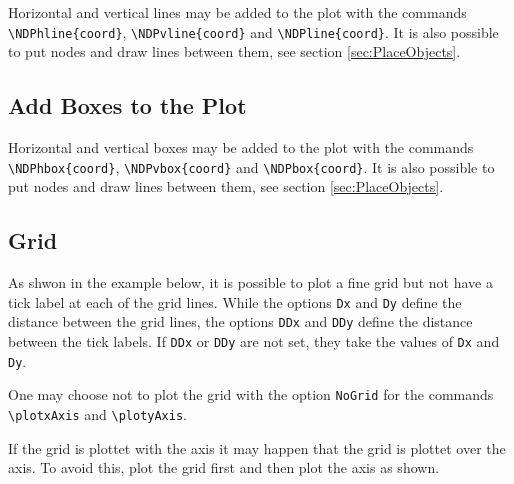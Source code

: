 Horizontal and vertical lines may be added to the plot with the commands
\verb|\NDPhline{coord}|, \verb|\NDPvline{coord}| and \verb|\NDPline{coord}|. It is also possible to put
nodes and draw lines between them, see section \ref{sec:PlaceObjects}.

\begin{minipage}[T]{0.5\linewidth}
	
\end{minipage}
\hspace{1ex}
\begin{minipage}[T]{0.4\linewidth}
	
\end{minipage}


\subsection{Add Boxes to the Plot}

Horizontal and vertical boxes may be added to the plot with the commands
\verb|\NDPhbox{coord}|, \verb|\NDPvbox{coord}| and \verb|\NDPbox{coord}|. It is also possible to put
nodes and draw lines between them, see section \ref{sec:PlaceObjects}.

\begin{minipage}[T]{0.5\linewidth}
	
\end{minipage}
\hspace{1ex}
\begin{minipage}[T]{0.4\linewidth}
	
\end{minipage}


\subsection{Grid}

As shwon in the example below, it is possible to plot a fine grid but not have a
tick label at each of the grid lines. While the options \texttt{Dx} and
\texttt{Dy} define the distance between the grid lines, the options \texttt{DDx}
and \texttt{DDy} define the distance between the tick labels. If \texttt{DDx} or
\texttt{DDy} are not set, they take the values of \texttt{Dx} and \texttt{Dy}. 

One may choose not to plot the grid with
the option \texttt{NoGrid} for the commands \verb|\plotxAxis| and \verb|\plotyAxis|.

If the grid is plottet with the axis it may happen that the grid is plottet over
the axis. To avoid this, plot the grid first and then plot the axis as shown.

